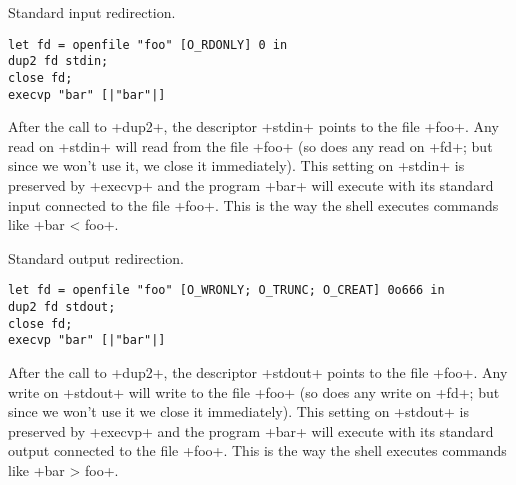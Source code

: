 \begin{myimage}[width="80\%"]
\end{myimage}

\begin{example} 
Standard input redirection.
%
\begin{lstlisting}
let fd = openfile "foo" [O_RDONLY] 0 in
dup2 fd stdin;
close fd;
execvp "bar" [|"bar"|]
\end{lstlisting}
% 
After the call to \ml+dup2+, the descriptor \ml+stdin+ points to the
file \ml+foo+. Any read on \ml+stdin+ will read from the file \ml+foo+
(so does any read on \ml+fd+; but since we won't use it, we close it
immediately). This setting on \ml+stdin+ is preserved by \ml+execvp+
and  the program \ml+bar+ will execute with its standard input
connected to the file \ml+foo+. This is the way the shell executes
commands like \ml+bar < foo+.
\end{example}

\begin{example} 
Standard output redirection.
%
\begin{lstlisting}
let fd = openfile "foo" [O_WRONLY; O_TRUNC; O_CREAT] 0o666 in
dup2 fd stdout;
close fd;
execvp "bar" [|"bar"|]
\end{lstlisting}
% 
After the call to \ml+dup2+, the descriptor \ml+stdout+ points to
the file \ml+foo+. Any write on \ml+stdout+ will write to the file
\ml+foo+ (so does any write on \ml+fd+; but since we won't use it we
close it immediately). This setting on \ml+stdout+ is preserved by
\ml+execvp+ and the program \ml+bar+ will execute with its standard output
connected to the file \ml+foo+. This is the way the shell executes
commands like \ml+bar > foo+.
\end{example}


